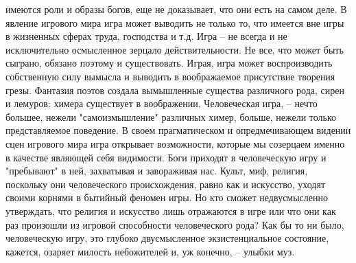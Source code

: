 \documentclass[12pt]{article}
\begin{document}
имеются роли и образы богов, еще не доказывает, что они есть на самом деле. В явление игрового мира игра
может выводить не только то, что имеется вне игры в жизненных сферах труда, господства и т.д. Игра -- не
всегда и не исключительно осмысленное зерцало действительности. Не все, что может быть сыграно, обязано
поэтому  и  существовать.  Играя,  игра  может  воспроизводить  собственную  силу  вымысла  и  выводить  в
воображаемое присутствие творения грезы. Фантазия поэтов создала вымышленные существа различного рода,
сирен  и  лемуров;  химера  существует  в  воображении.  Человеческая  игра,  --  нечто  большее,  нежели
"самоизмышление"  различных  химер,  больше,  нежели  только  представляемое  поведение.  В  своем
прагматическом и опредмечивающем видении сцен игрового мира игра открывает возможности, которые мы
созерцаем именно в качестве являющей себя видимости. Боги приходят в человеческую игру и "пребывают" в
ней, захватывая и завораживая нас. Культ, миф, религия, поскольку они человеческого происхождения, равно
как  и  искусство,  уходят  своими  корнями  в  бытийный  феномен  игры.  Но  кто  сможет  недвусмысленно
утверждать, что религия и искусство лишь отражаются в игре или что они как раз произошли из игровой
способности  человеческого  рода?  Как  бы  то  ни  было,  человеческую  игру,  это  глубоко  двусмысленное
экзистенциальное состояние, кажется, озаряет милость небожителей и, уж конечно, -- улыбки муз.


\newpage
\end{document}
